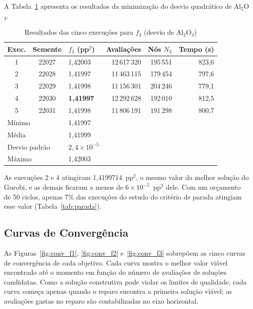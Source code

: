 \documentclass[conference]{IEEEtran}
\begin{document}
A Tabela~\ref{tab:res_f3} apresenta os resultados da minimização do desvio quadrático de Al$_2$O$_3$.

\begin{table}[htbp]
\caption{Resultados das cinco execuções para $f_3$ (desvio de Al$_2$O$_3$)}
\centering
\small\setlength{\tabcolsep}{2.8pt}
\begin{tabular}{c c l r r r}
\toprule
\textbf{Exec.} & \textbf{Semente} & \textbf{$f_3$ (pp$^2$)} & \textbf{Avaliações} & \textbf{Nós $N_3$} & \textbf{Tempo (s)} \\
\midrule
1 & 22027 & 1{,}42003 & 12\,617\,320 & 195\,551 & 823{,}6 \\
2 & 22028 & 1{,}41997 & 11\,463\,115 & 179\,454 & 797{,}6 \\
3 & 22029 & 1{,}41998 & 11\,156\,301 & 204\,246 & 779{,}1 \\
4 & 22030 & \textbf{1{,}41997} & 12\,292\,628 & 192\,010 & 812{,}5 \\
5 & 22031 & 1{,}41998 & 11\,806\,191 & 191\,298 & 800{,}7 \\
\midrule
\multicolumn{2}{l}{Mínimo} & 1{,}41997 & & & \\
\multicolumn{2}{l}{Média} & 1{,}41999 & & & \\
\multicolumn{2}{l}{Desvio padrão} & $2{,}4\times10^{-5}$ & & & \\
\multicolumn{2}{l}{Máximo} & 1{,}42003 & & & \\
\bottomrule
\end{tabular}
\label{tab:res_f3}
\end{table}

As execuções 2 e 4 atingiram 1{,}4199714~pp$^2$, o mesmo valor da melhor solução do Gurobi, e as demais ficaram a menos de $6\times10^{-5}$~pp$^2$ dele. Com um orçamento de 50 ciclos, apenas 7\% das execuções do estudo do critério de parada atingiam esse valor (Tabela~\ref{tab:parada}).

\subsection{Curvas de Convergência}

As Figuras~\ref{fig:conv_f1}, \ref{fig:conv_f2} e~\ref{fig:conv_f3} sobrepõem as cinco curvas de convergência de cada objetivo. Cada curva mostra o melhor valor viável encontrado até o momento em função do número de avaliações de soluções candidatas. Como a solução construtiva pode violar os limites de qualidade, cada curva começa apenas quando o reparo encontra a primeira solução viável; as avaliações gastas no reparo são contabilizadas no eixo horizontal.
\end{document}
